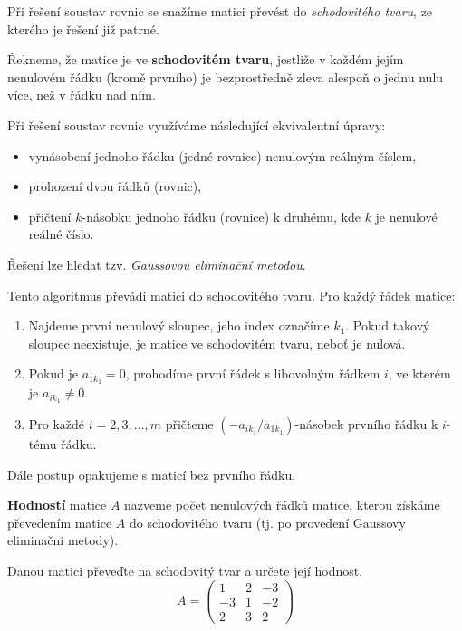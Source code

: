 Při řešení soustav rovnic se snažíme matici převést do \textit{schodovitého tvaru}, ze kterého
je řešení již patrné.

\begin{definition}
	Řekneme, že matice je ve \textbf{schodovitém tvaru}, jestliže v každém jejím nenulovém řádku (kromě prvního) je
	bezprostředně zleva alespoň o jednu nulu více, než v řádku nad ním.
\end{definition}

Při řešení soustav rovnic využíváme následující ekvivalentní úpravy:
\begin{itemize}
	\item vynásobení jednoho řádku (jedné rovnice) nenulovým reálným číslem,
	\item prohození dvou řádků (rovnic),
	\item přičtení $k$-násobku jednoho řádku (rovnice) k druhému, kde $k$ je nenulové reálné číslo.
\end{itemize}

Řešení lze hledat tzv. \textit{Gaussovou eliminační metodou}.

\begin{algoritmus}
	Tento algoritmus převádí matici do schodovitého tvaru. Pro každý řádek matice:
	\begin{enumerate}
		\item Najdeme první nenulový sloupec, jeho index označíme $k_1$. Pokud
		takový sloupec neexistuje, je matice ve schodovitém tvaru, neboť je nulová.
		\item Pokud je $a_{1k_1}=0$, prohodíme první řádek s libovolným řádkem $i$,
		ve kterém je $a_{ik_1} \ne 0$.
		\item Pro každé $i=2,3,\dots,m$ přičteme $(-a_{ik_1}/a_{1k_1})$-násobek prvního
		řádku k $i$-tému řádku.
	\end{enumerate}
	Dále postup opakujeme s maticí bez prvního řádku.
\end{algoritmus}



\begin{definition}
\textbf{Hodností} matice $A$ nazveme počet nenulových řádků matice, kterou získáme
převedením matice $A$ do schodovitého tvaru (tj. po provedení Gaussovy eliminační metody).
\end{definition}

\begin{priklad}
Danou matici převeďte na schodovitý tvar a určete její hodnost.
$$A=\begin{pmatrix}
    1 & 2 & -3 \\
    -3 & 1 & -2 \\
    2 & 3 & 2
\end{pmatrix}$$
\end{priklad}


